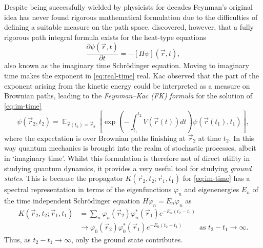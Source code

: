 \documentclass[12pt]{msml2020} %
\DeclareMathOperator*{\E}{\mathbb{E}}
\begin{document}
Despite being successfully wielded by physicists for decades Feynman's original idea has never found rigorous mathematical formulation due to the difficulties of defining a suitable measure on the path space. \cite{Kac:1949aa} discovered, however, that a fully rigorous path integral formula exists for the heat-type equations
%
\begin{equation}\label{eq:im-time}
  \frac{\partial\psi(\vec{r},t)}{\partial t} = -\left[H\psi\right](\vec{r},t),
\end{equation}
%
also known as the imaginary time Schr\"odinger equation. Moving to imaginary time makes the exponent in \eqref{eq:real-time} real. Kac observed that the part of the exponent arising from the kinetic energy could be interpreted as a measure on Brownian paths, leading to the \emph{Feynman--Kac (FK) formula} for the solution of \eqref{eq:im-time}
%
\begin{equation}\label{eq:FK}
  \psi(\vec{r}_2,t_2) =  \E_{\vec{r}(t_2)=\vec{r}_2}\left[\exp\left(-\int_{t_1}^{t_2}V(\vec{r}(t))dt\right)\psi(\vec{r}(t_1),t_1)\right],
\end{equation}
%
where the expectation is over Brownian paths finishing at $\vec{r}_2$ at time $t_2$. In this way quantum mechanics is brought into the realm of stochastic processes, albeit in `imaginary time'. Whilst this formulation is therefore not of direct utility in studying quantum dynamics, it provides a very useful tool for studying \emph{ground states}. This is because the propagator $K(\vec{r}_2,t_2;\vec{r}_1,t_1)$ for \eqref{eq:im-time} has a spectral representation in terms of the eigenfunctions $\varphi_n$ and eigenenergies $E_n$ of the time independent Schr\"odinger equation $H\varphi_n = E_n\varphi_n$ as
%
\begin{align}\label{eq:long-time}
  K(\vec{r}_2,t_2;\vec{r}_1,t_1) &= \sum_n \varphi_n(\vec{r}_2)\varphi^*_n(\vec{r}_1)e^{-E_n(t_2-t_1)}\\
  &\longrightarrow \varphi_0(\vec{r}_2)\varphi^*_0(\vec{r}_1)e^{-E_0(t_2-t_1)} \qquad \text{ as } t_2-t_1\to\infty.
\end{align}
%
Thus, as $t_2-t_1\to\infty$, only the ground state contributes.
\end{document}
